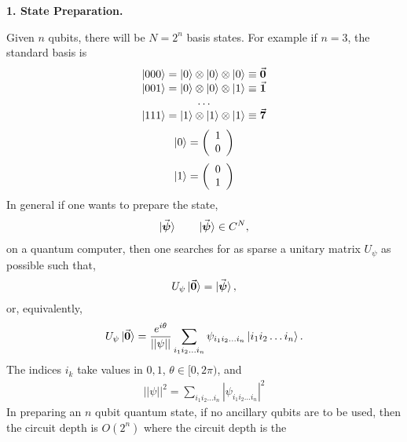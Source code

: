 \documentclass[a4paper,fleqn]{cas-sc}
\newcommand{\bmpsi}{\mbox{\boldmath $\psi$\unboldmath}}
\newcommand{\bmzero}{\mbox{\boldmath $0$\unboldmath}}
\newcommand{\bmone}{\mbox{\boldmath $1$\unboldmath}}
\newcommand{\bmseven}{\mbox{\boldmath $7$\unboldmath}}
\begin{document}
\par\noindent
\textbf{1. State Preparation.}
\par\noindent
Given $n$ qubits, there will be $N=2^{n}$ basis states.  For example
if $n=3$, the standard basis is
\begin{eqnarray*}
\begin{array}{c}
\ket{000}=\ket{0}\otimes \ket{0} \otimes \ket{0} \equiv \vec{\bmzero} \\
\ket{001}=\ket{0}\otimes \ket{0} \otimes \ket{1} \equiv \vec{\bmone} \\
\ldots \\
\ket{111}=\ket{1}\otimes \ket{1} \otimes \ket{1} \equiv \vec{\bmseven} 
\end{array}
\end{eqnarray*}
\begin{eqnarray*}
\ket{0}=\left( \begin{array}{c} 1 \\ 0 \end{array} \right)
\end{eqnarray*}
\begin{eqnarray*}
\ket{1}=\left( \begin{array}{c} 0 \\ 1 \end{array} \right)
\end{eqnarray*}
In general if one wants to prepare the state,
\begin{eqnarray*}
\ket{\vec{\bmpsi}} \hspace{20pt} \ket{\vec{\bmpsi}} \in C^{N},
\end{eqnarray*}
on a quantum computer, then one searches for as sparse a unitary matrix
$U_{\psi}$ as possible such that,
\begin{eqnarray*}
U_{\psi}\ket{\vec{\bmzero}}=\ket{\vec{\bmpsi}},
\end{eqnarray*}
or, equivalently,
\begin{eqnarray*}
U_{\psi}\ket{\vec{\bmzero}}=\frac{e^{i\theta}}{||\psi||}
 \sum_{i_{1}i_{2}\ldots i_{n}} \psi_{i_{1}i_{2}\ldots i_{n}}
 \ket{i_{1}i_{2}\ldots i_{n}}.
\end{eqnarray*}
The indices $i_{k}$ take values in ${0,1}$,
$\theta \in [0,2\pi)$, and
\begin{eqnarray*}
||\psi||^{2}=\sum_{i_{1}i_{2}\ldots i_{n}} |\psi_{i_{1}i_{2}\ldots i_{n}}|^{2}
\end{eqnarray*}
In preparing an $n$ qubit quantum state, if no ancillary qubits are to be
used, then the circuit depth is $O(2^{n})$ where the circuit depth is the
\end{document}
